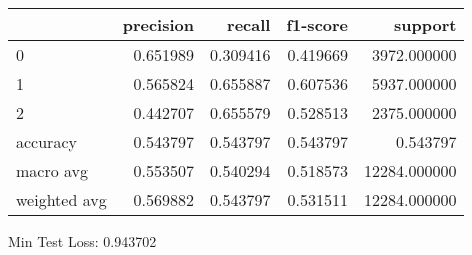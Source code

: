 \begin{tabular}{lrrrr}
\toprule
{} &  precision &    recall &  f1-score &       support \\
\midrule
0            &   0.651989 &  0.309416 &  0.419669 &   3972.000000 \\
1            &   0.565824 &  0.655887 &  0.607536 &   5937.000000 \\
2            &   0.442707 &  0.655579 &  0.528513 &   2375.000000 \\
accuracy     &   0.543797 &  0.543797 &  0.543797 &      0.543797 \\
macro avg    &   0.553507 &  0.540294 &  0.518573 &  12284.000000 \\
weighted avg &   0.569882 &  0.543797 &  0.531511 &  12284.000000 \\
\bottomrule
\end{tabular}

Min Test Loss: 0.943702